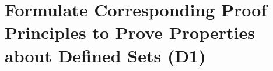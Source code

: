 \documentclass[12pt, a4paper, twoside]{report} %
\begin{document}
\section{Formulate Corresponding Proof Principles to Prove Properties about Defined Sets (D1)}
\label{sec:D1}




\end{document}
